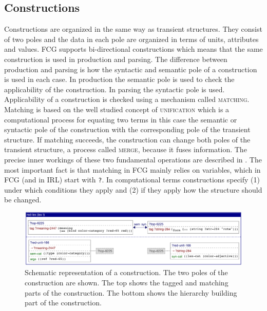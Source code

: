 \subsection{Constructions}
Constructions are organized in the same way as transient structures.
They consist of two poles and the data in each pole are organized in terms of units, 
attributes and values. FCG supports bi-directional constructions which means
that the same construction is used in production and parsing. 
The difference between production and parsing is how the syntactic and semantic 
pole of a construction is used in each case. 
In production the semantic pole is used to check the applicability
of the construction. In parsing the syntactic pole is used. Applicability
of a construction is checked using a mechanism called \textsc{matching}.
Matching is based on the well studied concept of \textsc{unification} which 
is a computational process for equating two terms in this 
case the semantic or syntactic pole of the construction with the corresponding 
pole of the transient structure. If matching succeeds, the construction can
change both poles of the transient structure, a process called \textsc{merge},
because it fuses information.
The precise inner workings of these two fundamental operations 
are described in \citet{steels2006fcg}.
The most important fact is that matching in FCG mainly relies on 
variables, which in FCG (and in IRL) start with {\footnotesize\tt ?}.
In computational terms constructions specify (1) under which conditions
they apply and (2) if they apply how the structure should be changed.

\begin{figure}
\begin{center}
\includegraphics[width=\textwidth]{figs/lex-rot-cxn}
\end{center}
\caption[Schematic representation of a construction]{Schematic representation 
of a construction. The two poles
of the construction are shown. The top shows 
the tagged and matching parts of the construction. The 
bottom shows the hierarchy building part of the construction.}
\label{f:lex-rot-cxn}
\end{figure}


